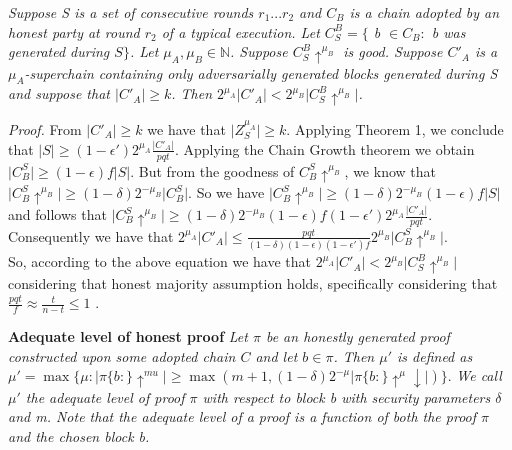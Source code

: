 \begin{lemma}
	\textit{Suppose S is a set of consecutive rounds $r_1 ... r_2$
	and $C_B$ is a chain adopted by an honest party at round $r_2$ of a typical
	execution. Let $C^{B}_{S} = \{$ b $\in C_B:$ b was generated during $S\}$. Let
	$\mu_A, \mu_B \in \mathbb{N}$. Suppose $C^{B}_{S}\uparrow^{\mu_B}$ is good.
	Suppose $C'_A$ is a $\mu_A$-superchain containing only adversarially generated
	blocks generated during S and suppose that $\vert C'_A \vert \geq k$. Then
	$2^{\mu_A} \vert C'_A \vert <  2^{\mu_B} \vert    C^{B}_{S}\uparrow^{\mu_B}\vert $. }\\
	\label{lemma:honest_vs_pure_adversarial_subchain}
\end{lemma}
\textit{Proof.} From $\vert C'_A \vert \geq k$ we have that $\vert Z^{\mu_A}_S
\vert \geq k$. Applying Theorem 1, we conclude that $\vert S \vert \geq
(1-\epsilon')2^{\mu_A} \frac{\vert C'_A \vert}{pqt}$. Applying the Chain Growth
theorem \cite{Backbone} we obtain $\vert C_{B}^S \vert \geq (1 - \epsilon)f
\vert S \vert$. But from the goodness of $C_{B}^S \uparrow^{\mu_B}$, we know
that $\vert C_{B}^S\uparrow^{\mu_B} \vert \geq (1 - \delta)2^{-\mu_B} \vert
C_{B}^S \vert $. So we have $\vert C_{B}^S\uparrow^{\mu_B} \vert \geq
(1 - \delta)2^{-\mu_B} (1 - \epsilon)f \vert S \vert $ and follows that
$\vert C_{B}^S\uparrow^{\mu_B} \vert \geq (1 - \delta)2^{-\mu_B} (1 - \epsilon)f
(1-\epsilon')2^{\mu_A} \frac{\vert C'_A \vert}{pqt} $. Consequently we have that
$2^{\mu_A} \vert C'_A \vert \leq \frac{pqt}{(1- \delta)(1-\epsilon)(1-\epsilon')f}
2^{\mu_B} \vert C_{B}^S\uparrow^{\mu_B} \vert $.   \\

So, according to the above equation we have that $2^{\mu_A} \vert C'_A \vert
<  2^{\mu_B} \vert    C^{B}_{S}\uparrow^{\mu_B}\vert $ considering that honest
majority assumption holds, specifically considering that $ \frac{pqt}{f} \approx
\frac{t}{n-t} \leq 1 $ .\\

\begin{defn}{\textbf{Adequate level of honest proof}}
	\textit{Let $\pi$ be an
	honestly generated proof constructed upon some adopted chain $C$ and let $b \in 
	\pi $. Then $\mu'$ is defined as $\mu' = \max \{ \mu: \vert \pi\{b:\}\uparrow^{mu}
	\vert \geq \max( m+1, (1-\delta)2^{-\mu} \vert \pi\{b:\}\uparrow^{\mu}\downarrow \vert )\}$}.
	\textit{We call $\mu'$ the adequate level of proof $\pi$ with respect to block b with
	security parameters $\delta$ and m. Note that the adequate level of a proof is a
	function of both the proof $\pi$ and the chosen block b.}
\end{defn}

